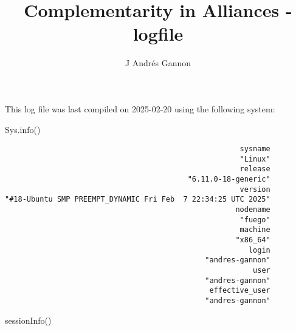 \documentclass[
  12,
  letterpaper,
  DIV=11,
  numbers=noendperiod]{scrartcl}
\title{\singlespace Complementarity in Alliances - logfile}
\author{J Andrés Gannon}
\date{}
\newenvironment{Shaded}{\begin{snugshade}}{\end{snugshade}}
\newcommand{\FunctionTok}[1]{\textcolor[rgb]{0.28,0.35,0.67}{#1}}
\newcommand{\NormalTok}[1]{\textcolor[rgb]{0.00,0.23,0.31}{#1}}
\begin{document}
\maketitle


This log file was last compiled on 2025-02-20 using the following
system:

\begin{Shaded}
\begin{Highlighting}[numbers=left,,]
\FunctionTok{Sys.info}\NormalTok{()}
\end{Highlighting}
\end{Shaded}

\begin{verbatim}
                                                      sysname 
                                                      "Linux" 
                                                      release 
                                          "6.11.0-18-generic" 
                                                      version 
"#18-Ubuntu SMP PREEMPT_DYNAMIC Fri Feb  7 22:34:25 UTC 2025" 
                                                     nodename 
                                                      "fuego" 
                                                      machine 
                                                     "x86_64" 
                                                        login 
                                              "andres-gannon" 
                                                         user 
                                              "andres-gannon" 
                                               effective_user 
                                              "andres-gannon" 
\end{verbatim}

\begin{Shaded}
\begin{Highlighting}[numbers=left,,]
\FunctionTok{sessionInfo}\NormalTok{()}
\end{Highlighting}
\end{Shaded}
\end{document}
